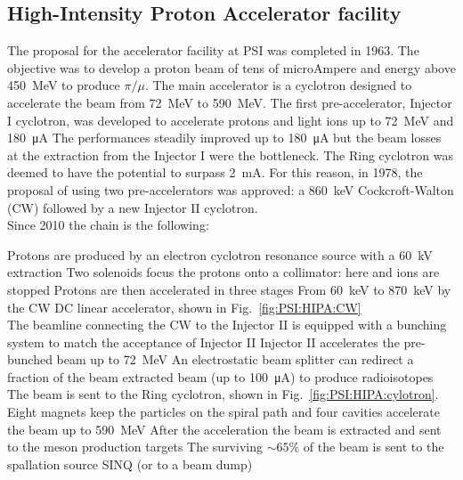 \begin{refsection}
    \subsection{High-Intensity Proton Accelerator facility}
        \label{sec:hipa}
        The proposal for the accelerator facility at PSI was completed in 1963. The objective was to develop a proton beam of tens of microAmpere and energy above \SI{450}{MeV} to produce $\pi/\mu$.
        The main accelerator is a cyclotron designed to accelerate the beam from \SI{72}{MeV} to \SI{590}{MeV}. 
        The first pre-accelerator, Injector I cyclotron, was developed to accelerate protons and light ions up to \SI{72}{MeV} and \SI{180}{\micro A}
        The performances steadily improved up to \SI{180}{\micro A} but the beam losses at the extraction from the Injector I were the bottleneck.
        The Ring cyclotron was deemed to have the potential to surpass \SI{2}{mA}. For this reason,  in 1978, the proposal of using two pre-accelerators was approved: a \SI{860}{keV} Cockcroft-Walton (CW) followed by a new Injector II cyclotron.\\
        Since 2010 the chain is the following:
        \begin{outline}
            \1 Protons are produced by an electron cyclotron resonance source with a \SI{60}{kV} extraction
            \1 Two solenoids focus the protons onto a collimator: here  and  ions are stopped
            \1 Protons are then accelerated in three stages
                \2 From \SI{60}{keV} to \SI{870}{keV} by the CW DC linear accelerator, shown in Fig.~\ref{fig:PSI:HIPA:CW}\\
                The beamline connecting the CW to the Injector II is equipped with a bunching system to match the acceptance of Injector II
                \2 Injector II accelerates the pre-bunched beam up to \SI{72}{MeV}
                An electrostatic beam splitter can redirect a fraction of the beam extracted beam (up to \SI{100}{\micro A}) to produce radioisotopes 
                \2 The beam is sent to the Ring cyclotron, shown in Fig.~\ref{fig:PSI:HIPA:cylotron}. Eight magnets keep the particles on the spiral path and four cavities accelerate the beam up to \SI{590}{MeV}
            \1 After the acceleration the beam is extracted and sent to the meson production targets
            \1 The surviving $\sim65\%$ of the beam is sent to the spallation source SINQ (or to a beam dump)
        \end{outline}
            \begin{figure}

\end{figure}
\end{refsection}
